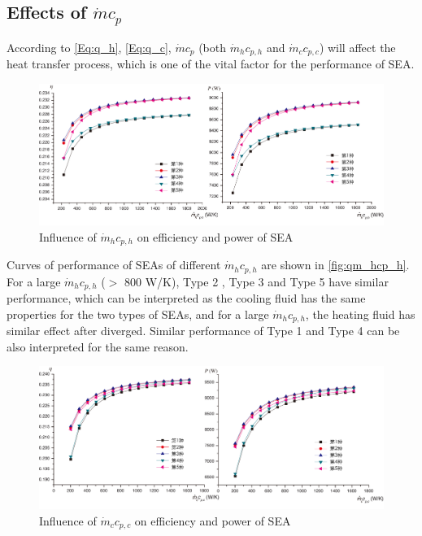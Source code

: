\subsection{Effects of $\dot{m}c_p$}

According to \autoref{Eq:q_h}, \autoref{Eq:q_c}, $\dot{m}c_p$ (both $\dot{m}_hc_{p,h}$ and $\dot{m}_cc_{p,c}$) will affect the heat transfer process, which is one of the vital factor for the performance of SEA.


\begin{figure}[htbp]
\centering
	\includegraphics[width = 0.7\columnwidth]{fig/qm_hcp_h}
	\caption{Influence of $\dot{m}_hc_{p,h}$ on efficiency and power of SEA}
	\label{fig:qm_hcp_h}
\end{figure}

Curves of performance of SEAs of different $\dot{m}_hc_{p,h}$ are shown in \autoref{fig:qm_hcp_h}.
For a large $\dot{m}_hc_{p,h}$ ($>$ 800 W/K), Type 2 , Type 3 and Type 5 have similar performance, which can be interpreted as the cooling fluid has the same properties for the two types of SEAs, and for a large $\dot{m}_hc_{p,h}$, the heating fluid has similar effect after diverged. Similar performance of Type 1 and Type 4 can be also interpreted for the same reason.

\begin{figure}[htbp]
\centering
	\includegraphics[width = 0.7\columnwidth]{fig/qm_ccp_c}
	\caption{Influence of $\dot{m}_cc_{p,c}$ on efficiency and power of SEA}
	\label{fig:qm_ccp_c}
\end{figure}

